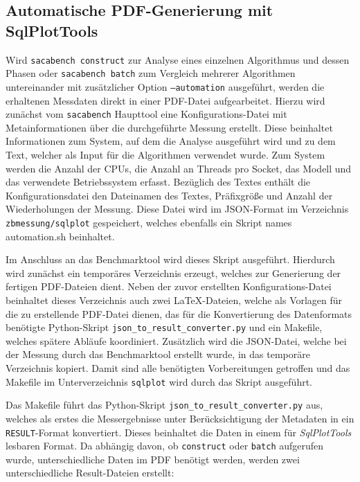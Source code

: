 \subsection{Automatische PDF-Generierung mit SqlPlotTools}
\label{framework:bechmark:sqlplottools}

Wird \texttt{sacabench construct} zur Analyse eines einzelnen Algorithmus und dessen Phasen oder \texttt{sacabench batch} zum Vergleich mehrerer Algorithmen untereinander mit zusätzlicher Option \texttt{--automation} ausgeführt, werden die erhaltenen Messdaten direkt in einer PDF-Datei aufgearbeitet.
Hierzu wird zunächst vom \texttt{sacabench} Haupttool eine Konfigurations-Datei mit Metainformationen über die durchgeführte Messung erstellt.
Diese beinhaltet Informationen zum System, auf dem die Analyse ausgeführt wird und zu dem Text, welcher als Input für die Algorithmen verwendet wurde.
Zum System werden die Anzahl der CPUs, die Anzahl an Threads pro Socket, das Modell und das verwendete Betriebssystem erfasst.
Bezüglich des Textes enthält die Konfigurationsdatei den Dateinamen des Textes, Präfixgröße und Anzahl der Wiederholungen der Messung.
Diese Datei wird im JSON-Format im Verzeichnis \texttt{zbmessung/sqlplot} gespeichert, welches ebenfalls ein Skript names automation.sh beinhaltet.\par
Im Anschluss an das Benchmarktool wird dieses Skript ausgeführt.
Hierdurch wird zunächst ein temporäres Verzeichnis erzeugt, welches zur Generierung der fertigen PDF-Dateien dient.
Neben der zuvor erstellten Konfigurations-Datei beinhaltet dieses Verzeichnis auch zwei LaTeX-Dateien, welche als Vorlagen für die zu erstellende PDF-Datei dienen, das für die Konvertierung des Datenformats benötigte Python-Skript \texttt{json\_to\_result\_converter.py} und ein Makefile, welches spätere Abläufe koordiniert.
Zusätzlich wird die JSON-Datei, welche bei der Messung durch das Benchmarktool erstellt wurde, in das temporäre Verzeichnis kopiert.
Damit sind alle benötigten Vorbereitungen getroffen und das Makefile im Unterverzeichnis \texttt{sqlplot} wird durch das Skript ausgeführt.\par\smallskip
Das Makefile führt das Python-Skript \texttt{json\_to\_result\_converter.py} aus, welches als erstes die Messergebnisse unter Berücksichtigung der Metadaten in ein \texttt{RESULT}-Format konvertiert.
Dieses beinhaltet die Daten in einem für \emph{SqlPlotTools} \cite{sqlplottools} lesbaren Format.
Da abhängig davon, ob \texttt{construct} oder \texttt{batch} aufgerufen wurde, unterschiedliche Daten im PDF benötigt werden, werden zwei unterschiedliche Result-Dateien erstellt:
